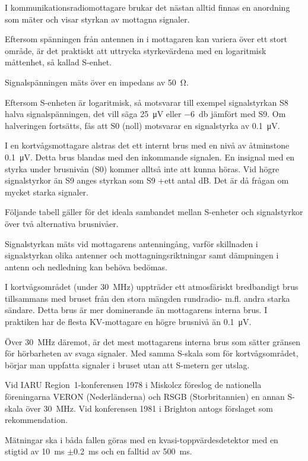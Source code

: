 \noindent
I kommunikationsradiomottagare brukar det nästan alltid finnas en anordning som
mäter och visar styrkan av mottagna signaler.

Eftersom spänningen från antennen in i mottagaren kan variera över ett stort
område, är det praktiskt att uttrycka styrkevärdena med en logaritmisk
måttenhet, så kallad S-enhet.

Signalspänningen mäts över en impedans av \qty{50}{\ohm}.

Eftersom S-enheten är logaritmisk, så motsvarar till exempel signalstyrkan S8
halva signalspänningen, det vill säga \qty{25}{\micro\volt} eller
\qty{-6}{\decibel} jämfört med S9.
Om halveringen fortsätts, fås att S0 (noll) motsvarar en signalstyrka av
\qty{0,1}{\micro\volt}.

I en kortvågsmottagare alstras det ett internt brus med en nivå av
åtminstone \qty{0,1}{\micro\volt}.
Detta brus blandas med den inkommande signalen.
En insignal med en styrka under brusnivån (S0) kommer alltså inte att
kunna höras.
Vid högre signalstyrkor än S9 anges styrkan som S9 +ett antal dB.
Det är då frågan om mycket starka signaler.

Följande tabell gäller för det ideala sambandet mellan S-enheter och
signalstyrkor över två alternativa brusnivåer.

Signalstyrkan mäts vid mottagarens antenningång, varför skillnaden i
signalstyrkan olika antenner och mottagningsriktningar samt dämpningen
i antenn och nedledning kan behöva bedömas.

I kortvågsområdet (under \qty{30}{\mega\hertz}) uppträder ett atmosfäriskt
bredbandigt brus tillsammans med bruset från den stora mängden rundradio- m.fl.
andra starka sändare.
Detta brus är mer dominerande än mottagarens interna brus.
I praktiken har de flesta KV-mottagare en högre brusnivå än
\qty{0,1}{\micro\volt}.

Över \qty{30}{\mega\hertz} däremot, är det mest mottagarens interna brus som
sätter gränsen för hörbarheten av svaga signaler.
Med samma S-skala som för kortvågsområdet, börjar man uppfatta signaler i
bruset utan att S-metern ger utslag.

Vid IARU Region~1-konferensen 1978 i Miskolcz föreslog de nationella
föreningarna VERON (Nederländerna) och RSGB (Storbritannien) en annan
S-skala över \qty{30}{\mega\hertz}.
Vid konferensen 1981 i Brighton antogs förslaget som rekommendation.

Mätningar ska i båda fallen göras med en kvasi-toppvärdesdetektor med en stigtid
av \qty{10}{\milli\second} \(\pm\)\qty{0,2}{\milli\second} och en falltid av
\qty{500}{\milli\second}.
